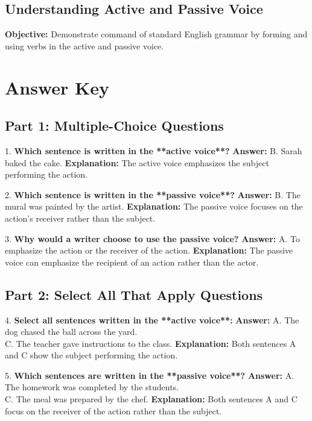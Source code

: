 \documentclass[12pt]{article}
\begin{document}
\subsection*{Understanding Active and Passive Voice}
\onehalfspacing

\begin{tcolorbox}[colframe=black!40, colback=gray!0, title=Learning Objective]
\textbf{Objective:} Demonstrate command of standard English grammar by forming and using verbs in the active and passive voice.
\end{tcolorbox}


\section*{Answer Key}

\subsection*{Part 1: Multiple-Choice Questions}

1. \textbf{Which sentence is written in the **active voice**?}  
\textbf{Answer:} B. Sarah baked the cake.  
\textbf{Explanation:} The active voice emphasizes the subject performing the action.

\vspace{1cm}
2. \textbf{Which sentence is written in the **passive voice**?}  
\textbf{Answer:} B. The mural was painted by the artist.  
\textbf{Explanation:} The passive voice focuses on the action's receiver rather than the subject.

\vspace{1cm}
3. \textbf{Why would a writer choose to use the passive voice?}  
\textbf{Answer:} A. To emphasize the action or the receiver of the action.  
\textbf{Explanation:} The passive voice can emphasize the recipient of an action rather than the actor.

\subsection*{Part 2: Select All That Apply Questions}

4. \textbf{Select all sentences written in the **active voice**:}  
\textbf{Answer:} A. The dog chased the ball across the yard. \\
C. The teacher gave instructions to the class.  
\textbf{Explanation:} Both sentences A and C show the subject performing the action.

\vspace{1cm}
5. \textbf{Which sentences are written in the **passive voice**?}  
\textbf{Answer:} A. The homework was completed by the students. \\
C. The meal was prepared by the chef.  
\textbf{Explanation:} Both sentences A and C focus on the receiver of the action rather than the subject.
\end{document}
